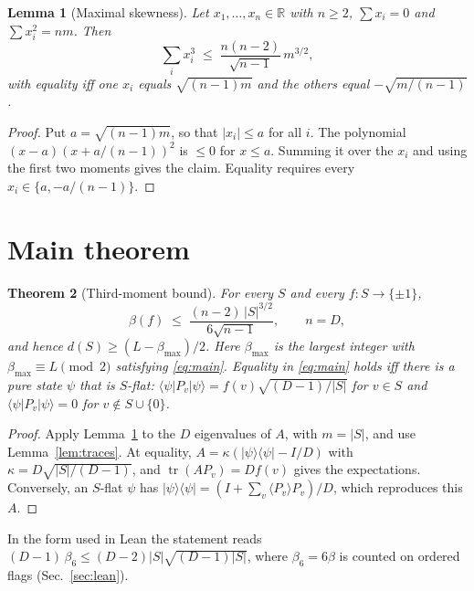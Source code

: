 \documentclass[aps,pra,onecolumn,11pt,superscriptaddress,nofootinbib]{revtex4-2}
\newtheorem{theorem}{Theorem}
\newtheorem{lemma}[theorem]{Lemma}
\theoremstyle{definition}
\theoremstyle{remark}
\newcommand{\tr}{\operatorname{tr}}
\begin{document}
\begin{lemma}[Maximal skewness]\label{lem:skew}
Let $x_1,\dots,x_n\in\mathbb R$ with $n\ge2$, $\sum x_i=0$ and $\sum x_i^2=nm$. Then
\begin{equation}
  \sum_i x_i^3\;\le\;\frac{n(n-2)}{\sqrt{n-1}}\,m^{3/2},
\end{equation}
with equality iff one $x_i$ equals $\sqrt{(n-1)m}$ and the others equal $-\sqrt{m/(n-1)}$.
\end{lemma}
\begin{proof}
Put $a=\sqrt{(n-1)m}$, so that $|x_i|\le a$ for all $i$. The polynomial
$(x-a)(x+a/(n-1))^2$ is $\le0$ for $x\le a$. Summing it over the $x_i$ and using the first two
moments gives the claim. Equality requires every $x_i\in\{a,-a/(n-1)\}$.
\end{proof}

\section{Main theorem}

\begin{theorem}[Third-moment bound]\label{thm:main}
For every $S$ and every $f:S\to\{\pm1\}$,
\begin{equation}\label{eq:main}
  \beta(f)\;\le\;\frac{(n-2)\,|S|^{3/2}}{6\sqrt{n-1}},\qquad n=D,
\end{equation}
and hence $d(S)\ge (L-\beta_{\max})/2$. Here $\beta_{\max}$ is the largest integer with
$\beta_{\max}\equiv L\pmod 2$ satisfying \eqref{eq:main}. Equality in \eqref{eq:main} holds iff
there is a pure state $\psi$ that is \emph{$S$-flat}: $\langle\psi|P_v|\psi\rangle=f(v)\sqrt{(D-1)/|S|}$
for $v\in S$ and $\langle\psi|P_v|\psi\rangle=0$ for $v\notin S\cup\{0\}$.
\end{theorem}
\begin{proof}
Apply Lemma~\ref{lem:skew} to the $D$ eigenvalues of $A$, with $m=|S|$, and use
Lemma~\ref{lem:traces}. At equality,
$A=\kappa(|\psi\rangle\langle\psi|-I/D)$ with $\kappa=D\sqrt{|S|/(D-1)}$, and
$\tr(AP_v)=Df(v)$ gives the expectations. Conversely, an $S$-flat $\psi$ has
$|\psi\rangle\langle\psi|=(I+\sum_v\langle P_v\rangle P_v)/D$, which reproduces this $A$.
\end{proof}

In the form used in Lean the statement reads
$(D-1)\,\beta_6\le(D-2)|S|\sqrt{(D-1)|S|}$, where $\beta_6=6\beta$ is counted on
ordered flags (Sec.~\ref{sec:lean}).
\end{document}
